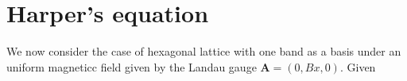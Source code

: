 \documentclass{report}
\begin{document}
\chapter{Harper's equation} \label{appendix b}
%
We now consider the case of hexagonal lattice with one band as a basis under an uniform magneticc field given by the Landau gauge $\mathbf{A} = (0, Bx,0)$. Given
\end{document}
